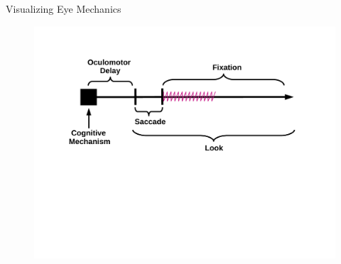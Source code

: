 \documentclass{beamer}
\providecommand{\cn}[1]{\textcolor{blue}{#1}}
\begin{document}
\begin{frame}{Visualizing Eye Mechanics}
\vspace{-1mm}
\begin{figure}
\centering
\includegraphics[scale=0.45]{img/what_is_a_look.pdf}
\end{figure}
\end{frame}


%
%
%
%
%
\end{document}
